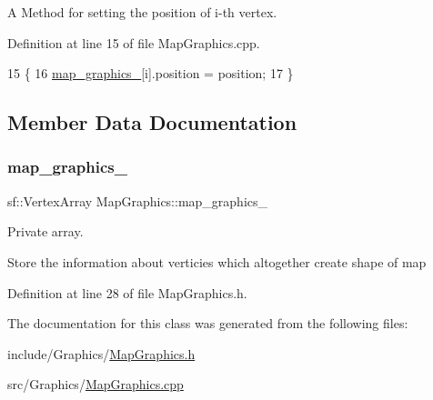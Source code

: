A Method for setting the position of i-\/th vertex. 



Definition at line 15 of file Map\+Graphics.\+cpp.


\begin{DoxyCode}
15                                                              \{
16     \hyperlink{classMapGraphics_a2136d586176f0c3a008182ff3fba50e3}{map\_graphics\_}[i].position = position;
17 \}
\end{DoxyCode}


\subsection{Member Data Documentation}
\mbox{\label{classMapGraphics_a2136d586176f0c3a008182ff3fba50e3}} 
\subsubsection{\texorpdfstring{map\+\_\+graphics\+\_\+}{map\_graphics\_}}
{\footnotesize\ttfamily sf\+::\+Vertex\+Array Map\+Graphics\+::map\+\_\+graphics\+\_\+\hspace{0.3cm}{\ttfamily [private]}}



Private array. 

Store the information about verticies which altogether create shape of map 

Definition at line 28 of file Map\+Graphics.\+h.



The documentation for this class was generated from the following files\+:\begin{DoxyCompactItemize}
\item 
include/\+Graphics/\hyperlink{MapGraphics_8h}{Map\+Graphics.\+h}\item 
src/\+Graphics/\hyperlink{MapGraphics_8cpp}{Map\+Graphics.\+cpp}\end{DoxyCompactItemize}
